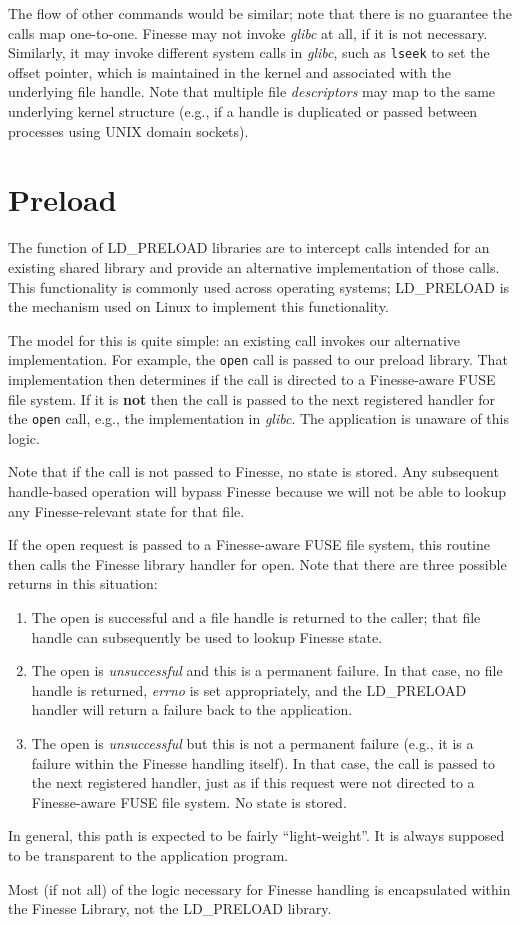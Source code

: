 \documentclass[a4paper,11pt]{article}
\begin{document}
The flow of other commands would be similar; note that there is no guarantee the calls map one-to-one.  Finesse may not invoke \textit{glibc} at all, if it is not necessary.  Similarly, it may invoke different system calls in \textit{glibc}, such as \texttt{lseek} to set the offset pointer, which is maintained in the kernel and associated with the underlying file handle.  Note that multiple file \textit{descriptors} may map to the same underlying kernel structure (e.g., if a handle is duplicated or passed between processes using UNIX domain sockets).

\section{Preload}\label{sec:preload}

The function of LD\_PRELOAD libraries are to intercept calls intended for an existing shared library and provide an alternative implementation of those calls.  This functionality is commonly used across operating systems; LD\_PRELOAD is the mechanism used on Linux to implement this functionality.

The model for this is quite simple: an existing call invokes our alternative implementation.  For example, the \texttt{open} call is passed to our preload library.  That implementation then determines if the call is directed to a Finesse-aware FUSE file system.  If it is \textbf{not} then the call is passed to the next registered handler for the \texttt{open} call, e.g., the implementation in \textit{glibc}.  The application is unaware of this logic.

Note that if the call is not passed to Finesse, no state is stored.  Any subsequent handle-based operation will bypass Finesse because we will not be able to lookup any Finesse-relevant state for that file.

If the open request is passed to a Finesse-aware FUSE file system, this routine then calls the Finesse library handler for open.  Note that there are three possible returns in this situation:

\begin{enumerate}
    \item The open is successful and a file handle is returned to the caller; that file handle can subsequently be used to lookup Finesse state.
    \item The open is \textit{unsuccessful} and this is a permanent failure.  In that case, no file handle is returned, \textit{errno} is set appropriately, and the LD\_PRELOAD handler will return a failure back to the application.
    \item The open is \textit{unsuccessful} but this is not a permanent failure (e.g., it is a failure within the Finesse handling itself).  In that case, the call is passed to the next registered handler, just as if this request were not directed to a Finesse-aware FUSE file system.  No state is stored.
\end{enumerate}

In general, this path is expected to be fairly ``light-weight''.  It is always supposed to be transparent to the application program.

Most (if not all) of the logic necessary for Finesse handling is encapsulated within the Finesse Library, not the LD\_PRELOAD library.
\end{document}

